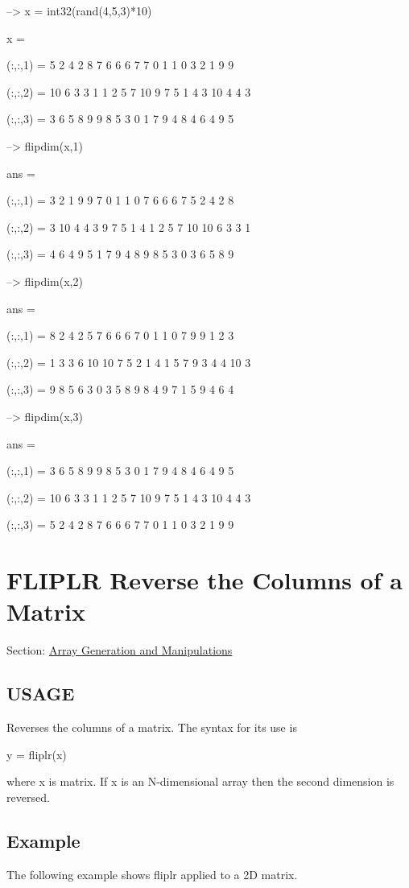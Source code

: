 \begin{DoxyVerbInclude}
--> x = int32(rand(4,5,3)*10)

x = 

(:,:,1) = 
  5  2  4  2  8 
  7  6  6  6  7 
  7  0  1  1  0 
  3  2  1  9  9 

(:,:,2) = 
 10  6  3  3  1 
  1  2  5  7 10 
  9  7  5  1  4 
  3 10  4  4  3 

(:,:,3) = 
  3  6  5  8  9 
  9  8  5  3  0 
  1  7  9  4  8 
  4  6  4  9  5 

--> flipdim(x,1)

ans = 

(:,:,1) = 
  3  2  1  9  9 
  7  0  1  1  0 
  7  6  6  6  7 
  5  2  4  2  8 

(:,:,2) = 
  3 10  4  4  3 
  9  7  5  1  4 
  1  2  5  7 10 
 10  6  3  3  1 

(:,:,3) = 
  4  6  4  9  5 
  1  7  9  4  8 
  9  8  5  3  0 
  3  6  5  8  9 

--> flipdim(x,2)

ans = 

(:,:,1) = 
  8  2  4  2  5 
  7  6  6  6  7 
  0  1  1  0  7 
  9  9  1  2  3 

(:,:,2) = 
  1  3  3  6 10 
 10  7  5  2  1 
  4  1  5  7  9 
  3  4  4 10  3 

(:,:,3) = 
  9  8  5  6  3 
  0  3  5  8  9 
  8  4  9  7  1 
  5  9  4  6  4 

--> flipdim(x,3)

ans = 

(:,:,1) = 
  3  6  5  8  9 
  9  8  5  3  0 
  1  7  9  4  8 
  4  6  4  9  5 

(:,:,2) = 
 10  6  3  3  1 
  1  2  5  7 10 
  9  7  5  1  4 
  3 10  4  4  3 

(:,:,3) = 
  5  2  4  2  8 
  7  6  6  6  7 
  7  0  1  1  0 
  3  2  1  9  9 
\end{DoxyVerbInclude}
 \hypertarget{array_fliplr}{}\section{F\-L\-I\-P\-L\-R Reverse the Columns of a Matrix}\label{array_fliplr}
Section\-: \hyperlink{sec_array}{Array Generation and Manipulations} \hypertarget{typecast_dec2bin_USAGE}{}\subsection{U\-S\-A\-G\-E}\label{typecast_dec2bin_USAGE}
Reverses the columns of a matrix. The syntax for its use is \begin{DoxyVerb}   y = fliplr(x)
\end{DoxyVerb}
 where {\ttfamily x} is matrix. If {\ttfamily x} is an N-\/dimensional array then the second dimension is reversed. \hypertarget{variables_struct_Example}{}\subsection{Example}\label{variables_struct_Example}
The following example shows {\ttfamily fliplr} applied to a 2\-D matrix.


